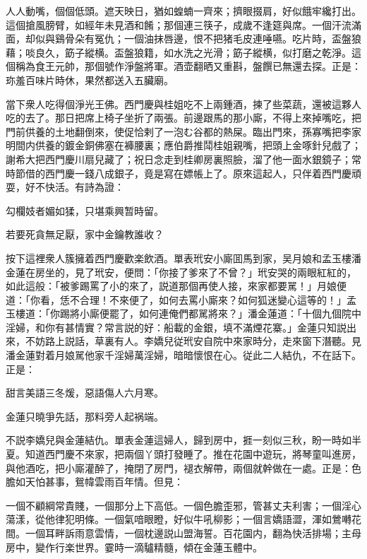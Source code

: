 \begin{myquote}
人人動嘴，個個低頭。遮天映日，猶如蝗蝻一齊來；擠眼掇肩，好似餓牢纔打出。這個搶風膀臂，如經年未見酒和餚；那個連三筷子，成歲不逢筵與席。一個汗流滿面，却似與鷄骨朵有冤仇；一個油抹唇邊，恨不把猪毛皮連唾嚥。吃片時，盃盤狼藉；啖良久，筯子縱横。盃盤狼籍，如水洗之光滑；筯子縱横，似打磨之乾淨。這個稱為食王元帥，那個號作淨盤將軍。酒壶翻晒又重斟，盤饌已無還去探。正是：珎羞百味片時休，果然都送入五臟廟。
\end{myquote}

當下衆人吃得個淨光王佛。西門慶與桂姐吃不上兩鍾酒，揀了些菜蔬，還被這夥人吃的去了。那日把席上椅子坐折了兩張。前邊跟馬的那小廝，不得上來掉嘴吃，把門前供養的土地翻倒來，使促恰剌了一泡む谷都的熱屎。臨出門來，孫寡嘴把李家明間内供養的鍍金銅佛塞在褲腰裏；應伯爵推鬦桂姐親嘴，把頭上金啄針兒戲了；謝希大把西門慶川扇兒藏了；祝日念走到桂卿房裏照臉，溜了他一面水銀鏡子；常時節借的西門慶一錢八成銀子，竟是寫在嫖帳上了。原來這起人，只伴着西門慶頑耍，好不快活。有詩為證：

\begin{myquote}
勾欄妓者媚如猱，只堪乘興暂時留。

若要死貪無足厭，家中金鑰教誰收？
\end{myquote}

按下這裡衆人簇擁着西門慶歡楽飲酒。單表玳安小廝囬馬到家，吴月娘和孟玉樓潘金蓮在房坐的，見了玳安，便問：「你接了爹來了不曾？」玳安哭的兩眼紅紅的，如此這般：「被爹踢罵了小的來了，説道那個再使人接，來家都要駡！」月娘便道：「你看，恁不合理！不來便了，如何去罵小廝來？如何狐迷變心這等的！」孟玉樓道：「你踢將小廝便罷了，如何連俺們都駡將來？」潘金蓮道：「十個九個院中淫婦，和你有甚情實？常言説的好：船載的金銀，填不滿煙花寨。」金蓮只知説出來，不妨路上説話，草裏有人。李嬌兒従玳安自院中來家時分，走來窗下潛聽。見潘金蓮對着月娘駡他家千淫婦萬淫婦，暗暗懷恨在心。従此二人結仇，不在話下。正是：

\begin{myquote}
甜言美語三冬煖，惡語傷人六月寒。

金蓮只曉爭先話，那料旁人起祸端。
\end{myquote}

不説李嬌兒與金蓮結仇。單表金蓮這婦人，歸到房中，捱一刻似三秋，盼一時如半夏。知道西門慶不來家，把兩個丫頭打發睡了。推在花園中遊玩，將琴童叫進房，與他酒吃，把小廝灌醉了，掩閉了房門，褪衣解帶，兩個就幹做在一處。正是：色膽如天怕甚事，鴛幃雲雨百年情。但見：

\begin{myquote}
一個不顧綱常貴賤，一個那分上下高低。一個色膽歪邪，管甚丈夫利害；一個淫心蕩漾，從他律犯明條。一個氣喑眼瞪，好似牛吼柳影；一個言嬌語澀，渾如鶯囀花間。一個耳畔訴雨意雲情，一個枕邊説山盟海誓。百花園内，翻為快活排場；主母房中，變作行楽世界。霎時一滴驢精髓，傾在金蓮玉體中。
\end{myquote}

